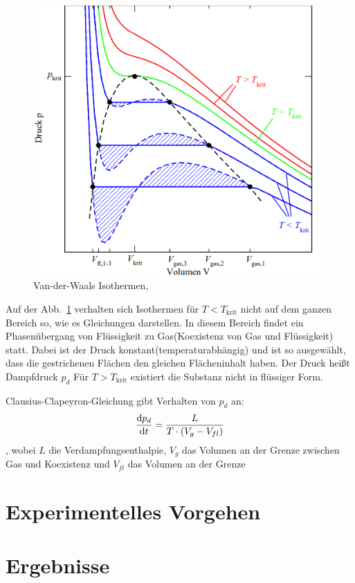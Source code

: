 \documentclass[11pt,a4paper]{article}
\begin{document}
\begin{figure}
    \centering
    \includegraphics[width=0.8\linewidth]{ZUS/Screenshot Van der Waals.png}
    \caption{Van-der-Waals Isothermen, \cite{ZUS}}
    \label{fig:IsoVan}
\end{figure}

Auf der Abb.~\ref{fig:IsoVan} verhalten sich Isothermen für $T<T_\text{krit}$ nicht auf dem ganzen Bereich so, wie es Gleichungen darstellen. In diesem Bereich findet ein Phasenübergang von Flüssigkeit zu Gas(Koexistenz von Gas und Flüssigkeit) statt. Dabei ist der Druck konstant(temperaturabhängig) und ist so ausgewählt, dass die gestrichenen Flächen den gleichen Flächeninhalt haben. Der Druck heißt Dampfdruck $p_d$ Für $T>T_\text{krit}$ existiert die Substanz nicht in flüssiger Form.

Clausius-Clapeyron-Gleichung gibt Verhalten von $p_d$ an:
\begin{equation}
    \odv{p_d}{t} = \frac{L}{T\cdot (V_g - V_{fl})}
\end{equation}, wobei $L$ die Verdampfungsenthalpie, $V_g$ das Volumen an der Grenze zwischen Gas und Koexistenz und $V_{fl}$ das Volumen an der Grenze

\section{Experimentelles Vorgehen}

\section{Ergebnisse} 
\end{document}
